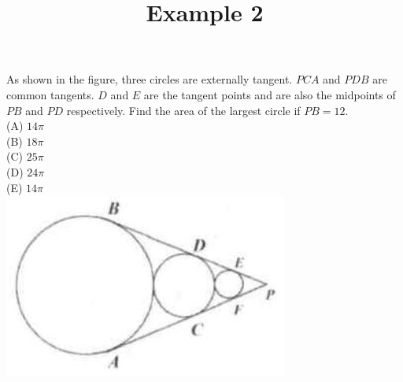 \documentclass{article}
\title{Example 2}
\date{}
\begin{document}
\maketitle

As shown in the figure, three circles are externally tangent. \(P C A\) and \(P D B\) are common tangents. \(D\) and \(E\) are the tangent points and are also the midpoints of \(P B\) and \(P D\) respectively. Find the area of the largest circle if \(P B=12\).\\
(A) \(14 \pi\)\\
(B) \(18 \pi\)\\
(C) \(25 \pi\)\\
(D) \(24 \pi\)\\
(E) \(14 \pi\)\\
\centering
\includegraphics[width=\textwidth]{images/problem_image_1.jpg}
\end{document}
